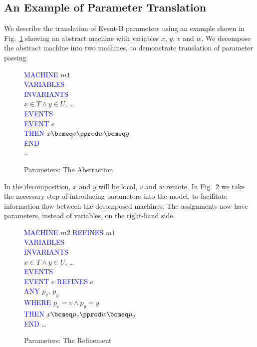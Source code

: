 \subsection{An Example of Parameter Translation}
We describe the translation of Event-B parameters using an example shown in Fig.~\ref{fig:absMch} showing an abstract machine with variables $x$, $y$, $v$ and $w$. We decompose the abstract machine into two machines, to demonstrate translation of parameter passing.
%
\begin{figure}
\centering
\begin{minipage}{0.4\textwidth}
\textcolor{blue}{MACHINE} $m1$  \\
\textcolor{blue}{VARIABLES} \\
\textcolor{blue}{INVARIANTS}\\
\hspace*{0.2cm}$x\in T \land y \in U$, \ldots\\
\textcolor{blue}{EVENTS}\\
\textcolor{blue}{EVENT} $e$\\
\hspace*{0.2cm}\textcolor{blue}{THEN} $x \bcmeq v \pprod w\bcmeq y$\\
\textcolor{blue}{END}\\
\ldots
\end{minipage}
\caption{Parameters: The Abstraction}
\label{fig:absMch}
\end{figure}
%
In the decomposition, $x$ and $y$ will be local, $v$ and $w$ remote. In Fig.~\ref{fig:addParams} we take the necessary step of introducing parameters into the model, to facilitate information flow between the decomposed machines. The assignments now have parameters, instead of variables, on the right-hand side.  
%
\begin{figure}
\centering
\begin{minipage}{0.4\textwidth}
\textcolor{blue}{MACHINE} $m2$ \textcolor{blue}{REFINES} $m1$  \\
\textcolor{blue}{VARIABLES} \\
\textcolor{blue}{INVARIANTS}\\
\hspace*{0.2cm}$x\in T \land y\in U$, \ldots\\
\textcolor{blue}{EVENTS}\\
\textcolor{blue}{EVENT} $e$ \textcolor{blue}{REFINES} $e$\\
\hspace*{0.2cm}\textcolor{blue}{ANY} $p_v$, $p_y$ \\
\hspace*{0.2cm}\textcolor{blue}{WHERE} $p_v = v  \land p_y = y$\\
\hspace*{0.2cm}\textcolor{blue}{THEN} $x \bcmeq p_v \pprod  w \bcmeq p_y$\\
\textcolor{blue}{END}
\ldots
\end{minipage}
\caption{Parameters: The Refinement}
\label{fig:addParams}
\end{figure}
